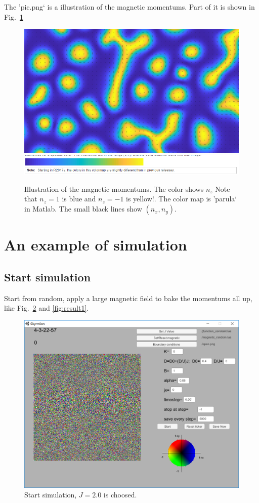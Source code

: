 \documentclass[aps,superscriptaddress,groupedaddress]{revtex4}  %
\begin{document}
The 'pic.png` is a illustration of the magnetic momentums. Part of it is shown in Fig.~\ref{Fig:output2}
\begin{figure}
\includegraphics[scale=0.3]{output2.png}
\includegraphics[scale=0.5]{parula.png}
\caption{\label{Fig:output2}Illustration of the magnetic momentums. The color shows $n_z$ \textcolor[rgb]{1,0,0}{Note that $n_z=1$ is blue and $n_z=-1$ is yellow!}. The color map is 'parula` in Matlab. The small black lines show $(n_x,n_y)$.}
\end{figure}

\section{\label{sec:7}An example of simulation}

\subsection{\label{sec:7.1}Start simulation}

Start from random, apply a large magnetic field to bake the momentums all up, like Fig.~\ref{Fig:start} and \ref{fig:result1}.
\begin{figure}
\includegraphics[scale=0.3]{start.png}
\caption{\label{Fig:start}Start simulation, $J=2.0$ is choosed.}
\end{figure}
\end{document}
